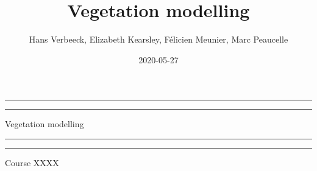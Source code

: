 \documentclass[oneside]{book}
\title{Vegetation modelling}
\author{Hans Verbeeck, Elizabeth Kearsley, Félicien Meunier, Marc Peaucelle}
\date{2020-05-27}
\begin{document}
\maketitle

\newcommand{\plogo}{\fbox{$\mathcal{PL}$}} %
\frontmatter


\begin{titlepage} %

	\centering %
	
	\scshape %
	
	\vspace*{\baselineskip} %
	
	
	\vspace{8\baselineskip}
	
	\rule{\textwidth}{1.6pt}\vspace*{-\baselineskip}\vspace*{2pt} %
	\rule{\textwidth}{0.4pt} %
	
	\vspace{0.75\baselineskip} %
	
	{\LARGE Vegetation modelling\\} %
	
	\vspace{0.75\baselineskip} %
	
	\rule{\textwidth}{0.4pt}\vspace*{-\baselineskip}\vspace{3.2pt} %
	\rule{\textwidth}{1.6pt} %
	
	\vspace{2\baselineskip} %
	
	
	Course XXXX %
	
	\vspace*{3\baselineskip} %
	
	

\end{titlepage}
\end{document}
